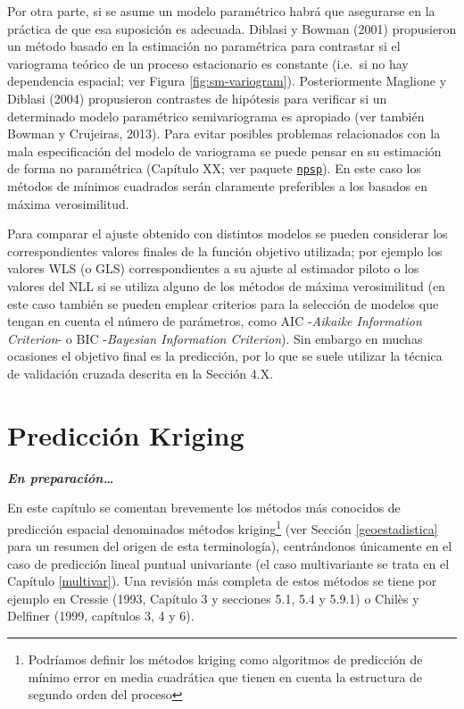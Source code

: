 \documentclass[
  spanish,
]{book}
\theoremstyle{break}
\theoremstyle{definition}
\theoremstyle{definition}
\theoremstyle{definition}
\theoremstyle{definition}
\theoremstyle{remark}
\begin{document}
Por otra parte, si se asume un modelo paramétrico habrá que asegurarse en la práctica de que esa suposición es adecuada.
Diblasi y Bowman (2001) propusieron un método basado en la estimación no paramétrica para contrastar si el variograma teórico de un proceso estacionario es constante (i.e.~si no hay dependencia espacial; ver Figura \ref{fig:sm-variogram}).
Posteriormente Maglione y Diblasi (2004) propusieron contrastes de hipótesis para verificar si un determinado modelo paramétrico semivariograma es apropiado (ver también Bowman y Crujeiras, 2013).
Para evitar posibles problemas relacionados con la mala especificación del modelo de variograma se puede pensar en su estimación de forma no paramétrica
(Capítulo XX; ver paquete \href{https://rubenfcasal.github.io/post/geoestadistica-no-parametrica-con-el-paquete-npsp}{\texttt{npsp}}).
En este caso los métodos de mínimos cuadrados serán claramente preferibles a los basados en máxima verosimilitud.

Para comparar el ajuste obtenido con distintos modelos se pueden considerar los correspondientes valores finales de la función objetivo utilizada; por ejemplo los valores WLS (o GLS) correspondientes a su ajuste al estimador piloto o los valores del NLL si se utiliza alguno de los métodos de máxima verosimilitud (en este caso también se pueden emplear criterios para la selección de modelos que tengan en cuenta el número de parámetros, como AIC -\emph{Aikaike Information Criterion}- o BIC -\emph{Bayesian Information Criterion}).
Sin embargo en muchas ocasiones el objetivo final es la predicción, por lo que se suele utilizar la técnica de validación cruzada descrita en la Sección 4.X.

\hypertarget{kriging}{%
\chapter{Predicción Kriging}\label{kriging}}

\textbf{\emph{En preparación\ldots{}}}

En este capítulo se comentan brevemente los métodos más conocidos de predicción espacial denominados métodos kriging\footnote{Podríamos definir los métodos kriging como algoritmos de predicción de mínimo error en media cuadrática que tienen en cuenta la estructura de segundo orden del proceso} (ver Sección \ref{geoestadistica} para un resumen del origen de esta terminología), centrándonos únicamente en el caso de predicción lineal puntual univariante (el caso multivariante se trata en el Capítulo \ref{multivar}).
Una revisión más completa de estos métodos se tiene por ejemplo en Cressie (1993, Capítulo 3 y secciones 5.1, 5.4 y 5.9.1) o Chilès y Delfiner (1999, capítulos 3, 4 y 6).
\end{document}
